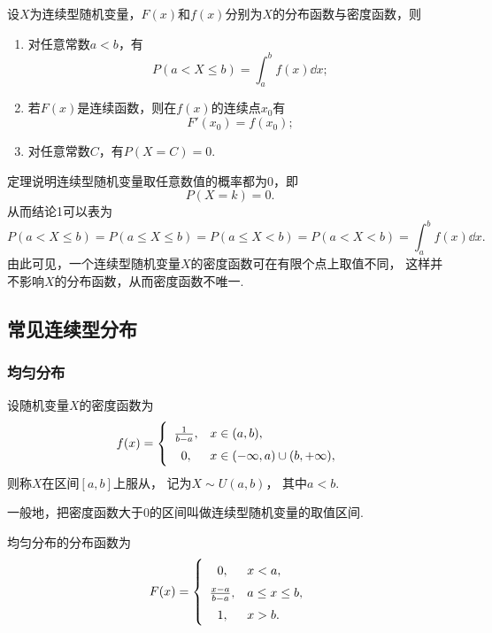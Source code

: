 \begin{theorem}
设\(X\)为连续型随机变量，\(F(x)\)和\(f(x)\)分别为\(X\)的分布函数与密度函数，则
\begin{enumerate}
	\item 对任意常数\(a < b\)，有\[
		P(a < X \leq b) = \int_a^b{f(x) \dd{x}};
	\]

	\item 若\(F(x)\)是连续函数，则在\(f(x)\)的连续点\(x_0\)有\[
		F'(x_0) = f(x_0);
	\]

	\item 对任意常数\(C\)，有\(P(X=C) = 0\).
\end{enumerate}
\end{theorem}

定理说明连续型随机变量取任意数值的概率都为0，即\[
	P(X=k) = 0.
\]
从而结论1可以表为\[
	P(a < X \leq b)
	= P(a \leq X \leq b)
	= P(a \leq X < b)
	= P(a < X < b)
	= \int_a^b f(x) \dd{x}.
\]
由此可见，一个连续型随机变量\(X\)的密度函数可在有限个点上取值不同，
这样并不影响\(X\)的分布函数，从而密度函数不唯一.

\subsection{常见连续型分布}

\subsubsection{均匀分布}
\begin{definition}
设随机变量\(X\)的密度函数为\begin{equation}
	f(x) = \left\{ \def\arraystretch{1.5}
	\begin{array}{cl}
		\frac{1}{b-a}, & x \in (a,b), \\
		0, & x \in (-\infty,a) \cup (b,+\infty), \\
	\end{array} \right.
\end{equation}
则称\(X\)在区间\([a,b]\)上服从，
记为\(X \sim U(a,b)\)，
其中\(a < b\).

一般地，把密度函数大于0的区间叫做连续型随机变量的取值区间.
\end{definition}

\begin{theorem}
均匀分布的分布函数为\begin{equation}
	F(x) = \left\{ \def\arraystretch{1.5}
	\begin{array}{cl}
		0, & x < a, \\
		\frac{x-a}{b-a}, & a \leq x \leq b, \\
		1, & x > b. \\
	\end{array} \right.
\end{equation}
\end{theorem}

